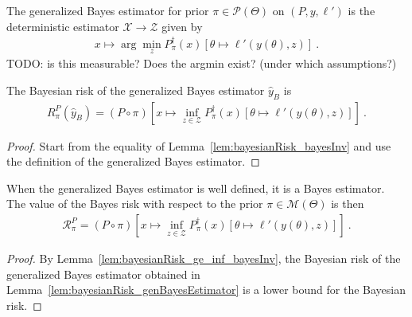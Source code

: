 \begin{definition}
  \label{def:genBayesEstimator}
  The generalized Bayes estimator for prior $\pi \in \mathcal P(\Theta)$ on $(P, y, \ell')$ is the deterministic estimator $\mathcal X \to \mathcal Z$ given by
  \begin{align*}
  x \mapsto \arg\min_z P_\pi^\dagger(x)\left[\theta \mapsto \ell'(y(\theta), z)\right] \: .
  \end{align*}
  TODO: is this measurable? Does the argmin exist? (under which assumptions?)
\end{definition}

\begin{lemma}
  \label{lem:bayesianRisk_genBayesEstimator}
  The Bayesian risk of the generalized Bayes estimator $\hat{y}_B$ is
  \begin{align*}
  R^P_\pi(\hat{y}_B) = (P \circ \pi)\left[x \mapsto \inf_{z \in \mathcal Z} P_\pi^\dagger(x) \left[\theta \mapsto \ell'(y(\theta), z)\right]\right]
  \: .
  \end{align*}
\end{lemma}

\begin{proof}%
{}
Start from the equality of Lemma~\ref{lem:bayesianRisk_bayesInv} and use the definition of the generalized Bayes estimator.
\end{proof}

\begin{theorem}
  \label{thm:isBayesEstimator_genBayesEstimator}
  When the generalized Bayes estimator is well defined, it is a Bayes estimator. The value of the Bayes risk with respect to the prior $\pi \in \mathcal M(\Theta)$ is then
  \begin{align*}
  \mathcal R^P_\pi = (P \circ \pi)\left[x \mapsto \inf_{z \in \mathcal Z} P_\pi^\dagger(x) \left[\theta \mapsto \ell'(y(\theta), z)\right]\right]
  \: .
  \end{align*}
\end{theorem}

\begin{proof}%
{}
By Lemma~\ref{lem:bayesianRisk_ge_inf_bayesInv}, the Bayesian risk of the generalized Bayes estimator obtained in Lemma~\ref{lem:bayesianRisk_genBayesEstimator} is a lower bound for the Bayesian risk.
\end{proof}

